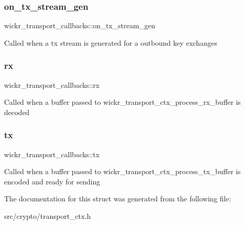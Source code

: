 \subsubsection{\texorpdfstring{on\+\_\+tx\+\_\+stream\+\_\+gen}{on\_tx\_stream\_gen}}
{\footnotesize\ttfamily wickr\+\_\+transport\+\_\+callbacks\+::on\+\_\+tx\+\_\+stream\+\_\+gen}

Called when a tx stream is generated for a outbound key exchanges \mbox{\label{structwickr__transport__callbacks_a5d523402980ac09fdf52aa4824f8e9f7}} 
\subsubsection{\texorpdfstring{rx}{rx}}
{\footnotesize\ttfamily wickr\+\_\+transport\+\_\+callbacks\+::rx}

Called when a buffer passed to wickr\+\_\+transport\+\_\+ctx\+\_\+process\+\_\+rx\+\_\+buffer is decoded \mbox{\label{structwickr__transport__callbacks_a06c4b21b847c00e92373cf1402e1cb9d}} 
\subsubsection{\texorpdfstring{tx}{tx}}
{\footnotesize\ttfamily wickr\+\_\+transport\+\_\+callbacks\+::tx}

Called when a buffer passed to wickr\+\_\+transport\+\_\+ctx\+\_\+process\+\_\+tx\+\_\+buffer is encoded and ready for sending 

The documentation for this struct was generated from the following file\+:\begin{DoxyCompactItemize}
\item 
src/crypto/transport\+\_\+ctx.\+h\end{DoxyCompactItemize}
